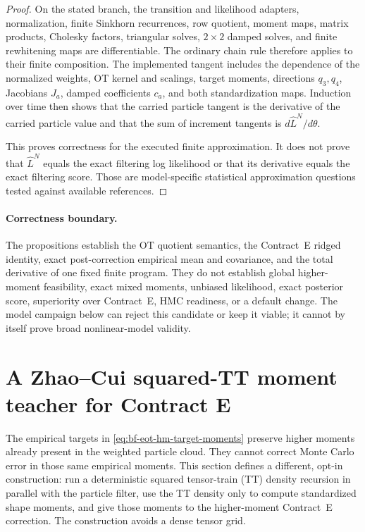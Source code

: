 \begin{proof}
On the stated branch, the transition and likelihood adapters, normalization,
finite Sinkhorn recurrences, row quotient, moment maps, matrix products,
Cholesky factors, triangular solves, \(2\times2\) damped solves, and finite
rewhitening maps are differentiable.  The ordinary chain rule therefore
applies to their finite composition.  The implemented tangent includes the
dependence of the normalized weights, OT kernel and scalings, target moments,
directions \(q_3,q_4\), Jacobians \(J_a\), damped coefficients \(c_a\), and
both standardization maps.  Induction over time then shows that the carried
particle tangent is the derivative of the carried particle value and that the
sum of increment tangents is \(d\widehat L^N/d\theta\).

This proves correctness for the executed finite approximation.  It does not
prove that \(\widehat L^N\) equals the exact filtering log likelihood or that
its derivative equals the exact filtering score.  Those are model-specific
statistical approximation questions tested against available references.
\end{proof}

\paragraph{Correctness boundary.}
The propositions establish the OT quotient semantics, the Contract~E ridged
identity, exact post-correction empirical mean and covariance, and the total
derivative of one fixed finite program.  They do not establish global
higher-moment feasibility, exact mixed moments, unbiased likelihood, exact
posterior score, superiority over Contract~E, HMC readiness, or a default
change.  The model campaign below can reject this candidate or keep it viable;
it cannot by itself prove broad nonlinear-model validity.

\section{A Zhao--Cui squared-TT moment teacher for Contract E}
\label{sec:bf-eot-zhao-cui-moment-teacher}

The empirical targets in
\eqref{eq:bf-eot-hm-target-moments} preserve higher moments already present in
the weighted particle cloud.  They cannot correct Monte Carlo error in those
same empirical moments.  This section defines a different, opt-in
construction: run a deterministic squared tensor-train (TT) density recursion
in parallel with the particle filter, use the TT density only to compute
standardized shape moments, and give those moments to the higher-moment
Contract~E correction.  The construction avoids a dense tensor grid.

